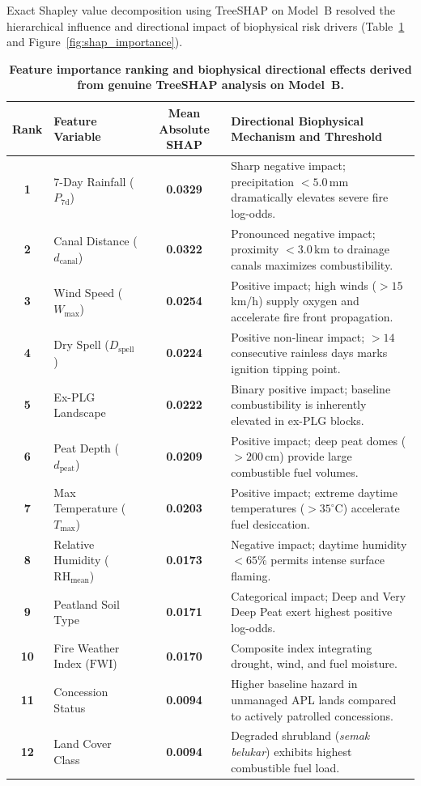 Exact Shapley value decomposition using TreeSHAP on Model~B resolved the hierarchical influence and directional impact of biophysical risk drivers (Table~\ref{tab:shap_ranking} and Figure~\ref{fig:shap_importance}).

\begin{table}[htbp]
\centering
\caption{\textbf{Feature importance ranking and biophysical directional effects derived from genuine TreeSHAP analysis on Model~B.}}
\label{tab:shap_ranking}
\small
\begin{tabular}{clcp{6.5cm}}
\toprule
\textbf{Rank} & \textbf{Feature Variable} & \textbf{Mean Absolute SHAP} & \textbf{Directional Biophysical Mechanism and Threshold} \\
\midrule
\textbf{1} & 7-Day Rainfall ($P_{\text{7d}}$) & \textbf{0.0329} & Sharp negative impact; precipitation $<5.0$\,mm dramatically elevates severe fire log-odds. \\
\textbf{2} & Canal Distance ($d_{\text{canal}}$) & \textbf{0.0322} & Pronounced negative impact; proximity $<3.0$\,km to drainage canals maximizes combustibility. \\
\textbf{3} & Wind Speed ($W_{\text{max}}$) & \textbf{0.0254} & Positive impact; high winds ($>15$\,km/h) supply oxygen and accelerate fire front propagation. \\
\textbf{4} & Dry Spell ($D_{\text{spell}}$) & \textbf{0.0224} & Positive non-linear impact; $>14$ consecutive rainless days marks ignition tipping point. \\
\textbf{5} & Ex-PLG Landscape & \textbf{0.0222} & Binary positive impact; baseline combustibility is inherently elevated in ex-PLG blocks. \\
\textbf{6} & Peat Depth ($d_{\text{peat}}$) & \textbf{0.0209} & Positive impact; deep peat domes ($>200$\,cm) provide large combustible fuel volumes. \\
\textbf{7} & Max Temperature ($T_{\text{max}}$) & \textbf{0.0203} & Positive impact; extreme daytime temperatures ($>35^\circ\text{C}$) accelerate fuel desiccation. \\
\textbf{8} & Relative Humidity ($\text{RH}_{\text{mean}}$) & \textbf{0.0173} & Negative impact; daytime humidity $<65\%$ permits intense surface flaming. \\
\textbf{9} & Peatland Soil Type & \textbf{0.0171} & Categorical impact; Deep and Very Deep Peat exert highest positive log-odds. \\
\textbf{10} & Fire Weather Index ($\text{FWI}$) & \textbf{0.0170} & Composite index integrating drought, wind, and fuel moisture. \\
\textbf{11} & Concession Status & \textbf{0.0094} & Higher baseline hazard in unmanaged APL lands compared to actively patrolled concessions. \\
\textbf{12} & Land Cover Class & \textbf{0.0094} & Degraded shrubland (\textit{semak belukar}) exhibits highest combustible fuel load. \\
\bottomrule
\end{tabular}
\end{table}

